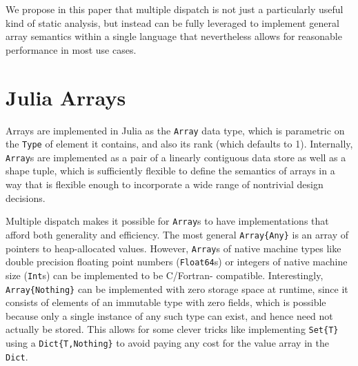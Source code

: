 \documentclass[preprint]{sigplanconf}
\newcommand{\code}[1]{\texttt{#1}}
\begin{document}
We propose in this paper that multiple dispatch is not just a particularly
useful kind of static analysis, but instead can be fully leveraged to
implement general array semantics within a single language that nevertheless
allows for reasonable performance in most use cases.


\section{Julia Arrays}

Arrays are implemented in Julia\cite{Bezanson:2012jf} as the \code{Array}
data type, which is parametric on the \code{Type} of element it contains, and
also its rank (which defaults to 1). Internally, \code{Array}s are implemented
as a pair of a linearly contiguous data store as well as a shape tuple, which
is sufficiently flexible to define the semantics of arrays in a way that is
flexible enough to incorporate a wide range of nontrivial design decisions.

Multiple dispatch makes it possible for \code{Array}s to have implementations
that afford both generality and efficiency. The most general
\code{Array\{Any\}} is an array of pointers to heap-allocated values. However,
\code{Array}s of native machine types like double precision floating point
numbers (\code{Float64}s) or integers of native machine size (\code{Int}s) can
be implemented to be C/Fortran- compatible. Interestingly,
\code{Array\{Nothing\}} can be implemented with zero storage space at runtime,
since it consists of elements of an immutable type with zero fields, which is
possible because only a single instance of any such type can exist, and hence
need not actually be stored. This allows for some clever tricks like
implementing \code{Set\{T\}} using a \code{Dict\{T,Nothing\}} to avoid paying
any cost for the value array in the \code{Dict}.
\end{document}
